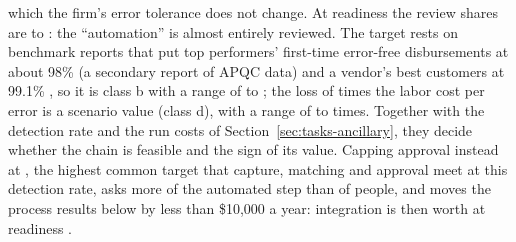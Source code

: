 which the firm's error tolerance does not change. At readiness \icIotaHigh{} the review shares are \icXiMin{} to \icXiMax: the ``automation'' is almost entirely reviewed. The \icQbarHigh{} target rests on benchmark reports that put top performers' first-time error-free disbursements at about 98\% (a secondary report of APQC data) and a vendor's best customers at 99.1\% \citep{fraxion2025apbenchmarks,medius2025apaccuracy}, so it is class b with a range of \icRbarHighLow{} to \icRbarHighHigh; the loss of \icLmultReg{} times the labor cost per error is a scenario value (class d), with a range of \icLmultRegLow{} to \icLmultRegHigh{} times. Together with the detection rate and the run costs of Section~\ref{sec:tasks-ancillary}, they decide whether the chain is feasible and the sign of its value. Capping approval instead at \icQstar, the highest common target that capture, matching and approval meet at this detection rate, asks more of the automated step than of people, and moves the process results below by less than \$10{,}000 a year: integration is then worth \icAltWfull{} at readiness \icIotaHigh.

